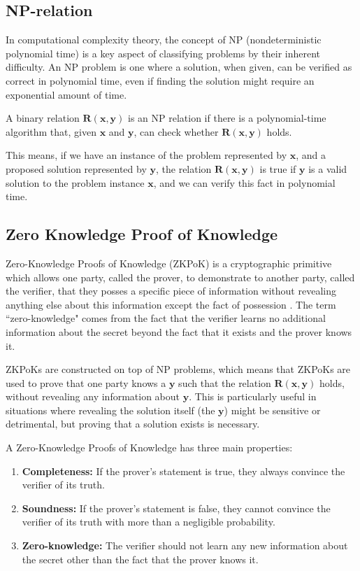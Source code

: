 \subsection{NP-relation}
In computational complexity theory, the concept of NP (nondeterministic polynomial time) is a key aspect of classifying problems by their inherent difficulty. An NP problem is one where a solution, when given, can be verified as correct in polynomial time, even if finding the solution might require an exponential amount of time.

A binary relation $\mathbf{R}(\mathbf{x}, \mathbf{y})$ is an NP relation if there is a polynomial-time algorithm that, given $\mathbf{x}$ and $\mathbf{y}$, can check whether $\mathbf{R}(\mathbf{x}, \mathbf{y})$ holds.

This means, if we have an instance of the problem represented by $\mathbf{x}$, and a proposed solution represented by $\mathbf{y}$, the relation $\mathbf{R}(\mathbf{x}, \mathbf{y})$ is true if $\mathbf{y}$ is a valid solution to the problem instance $\mathbf{x}$, and we can verify this fact in polynomial time.

\subsection{Zero Knowledge Proof of Knowledge}
Zero-Knowledge Proofs of Knowledge (ZKPoK) is a cryptographic primitive which allows one party, called the prover, to demonstrate to another party, called the verifier, that they posses a specific piece of information without revealing anything else about this information except the fact of possession \cite{Bellare1992OnDP, Goldwasser1985TheKC}.
The term ``zero-knowledge" comes from the fact that the verifier learns no additional information about the secret beyond the fact that it exists and the prover knows it. 

ZKPoKs are constructed on top of NP problems, which means that ZKPoKs are used to prove that one party knows a $\mathbf{y}$ such that the relation $\mathbf{R}(\mathbf{x}, \mathbf{y})$ holds, without revealing any information about $\mathbf{y}$. This is particularly useful in situations where revealing the solution itself (the $\mathbf{y}$) might be sensitive or detrimental, but proving that a solution exists is necessary.

A Zero-Knowledge Proofs of Knowledge has three main properties:

\begin{enumerate}
    \item \textbf{Completeness:} If the prover's statement is true, they always convince the verifier of its truth.
    \item \textbf{Soundness:} If the prover's statement is false, they cannot convince the verifier of its truth with more than a negligible probability.
    \item \textbf{Zero-knowledge:} The verifier should not learn any new information about the secret other than the fact that the prover knows it.
\end{enumerate}

